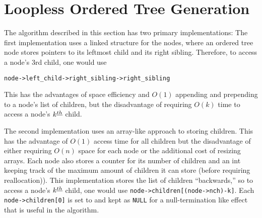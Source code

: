 \chapter{Loopless Ordered Tree Generation}
The algorithm described in this section has two primary implementations: The first implementation uses a linked structure for the nodes, where an ordered tree node stores pointers to its leftmost child and its right sibling.  Therefore, to access a node's 3rd child, one would use 

\verb+node->left_child->right_sibling->right_sibling+ 

This has the advantages of space efficiency and $O(1)$ appending and prepending to a node's list of children, but the disadvantage of requiring $O(k)$ time to access a node's $k^{\underline{th}}$ child. 

The second implementation uses an array-like approach to storing children.  This has the advantage of $O(1)$ access time for all children but the disadvantage of either requiring $O(n)$ space for each node or the additional cost of resizing arrays.  Each node also stores a counter for its number of children and an int keeping track of the maximum amount of children it can store (before requiring reallocation)).  This implementation stores the list of children ``backwards,'' so to access a node's $k^{\underline{th}}$ child, one would use \verb+node->children[(node->nch)-k]+.  Each \verb+node->children[0]+ is set to and kept as \verb+NULL+ for a null-termination like effect that is useful in the algorithm.
